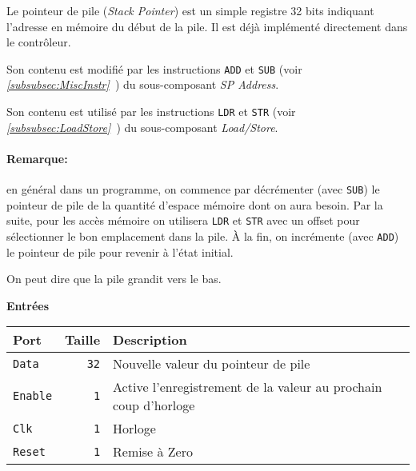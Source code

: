 \documentclass{article}
\begin{document}

    Le pointeur de pile (\textit{Stack Pointer}) est un simple registre 32 bits indiquant l'adresse en mémoire du début de la pile.
    Il est déjà implémenté directement dans le contrôleur.

    Son contenu est modifié par les instructions \texttt{ADD} et \texttt{SUB}
    (voir \textit{\ref{subsubsec:MiscInstr}~}) du sous-composant \textit{SP Address}.

    Son contenu est utilisé par les instructions \texttt{LDR} et \texttt{STR}
    (voir \textit{\ref{subsubsec:LoadStore}~}) du sous-composant \textit{Load/Store}.

    \paragraph{Remarque:} en général dans un programme, on commence par décrémenter (avec \texttt{SUB}) le pointeur de pile de la quantité d'espace mémoire dont on aura besoin.
    Par la suite, pour les accès mémoire on utilisera \texttt{LDR} et \texttt{STR} avec un offset pour sélectionner le bon emplacement dans la pile.
    À la fin, on incrémente (avec \texttt{ADD}) le pointeur de pile pour revenir à l'état initial.

    On peut dire que la pile grandit vers le bas.


    \textbf{Entrées}\\

    \begin{tabular}{|l|r|l|}
        \hline
        \textbf{Port}   & \textbf{Taille} & \textbf{Description}                                            \\
        \hline

        \texttt{Data}   & \texttt{32}     & Nouvelle valeur du pointeur de pile                             \\
        \hline
        \texttt{Enable} & \texttt{1}      & Active l'enregistrement de la valeur au prochain coup d'horloge \\
        \hline
        \texttt{Clk}    & \texttt{1}      & Horloge                                                         \\
        \hline
        \texttt{Reset}  & \texttt{1}      & Remise à Zero                                                   \\
        \hline


        \hline
    \end{tabular}
\end{document}
